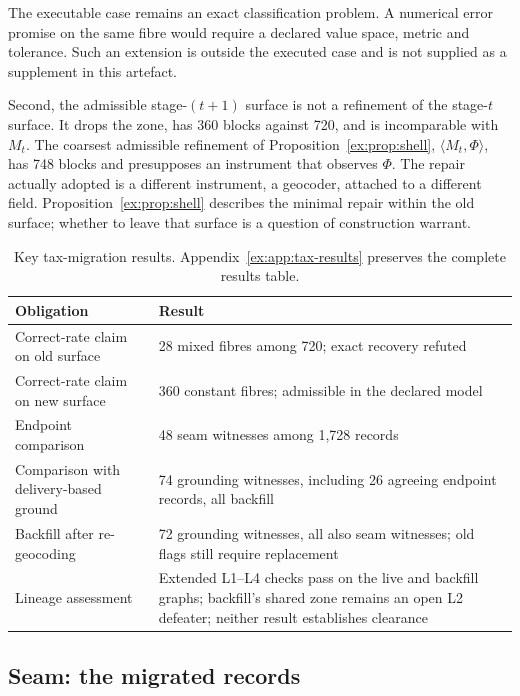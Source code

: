 \documentclass[11pt]{article}
\theoremstyle{definition}
\begin{document}
The executable case remains an exact classification problem. A numerical error promise on the same fibre would require a declared value space, metric and tolerance. Such an extension is outside the executed case and is not supplied as a supplement in this artefact.

Second, the admissible stage-$(t+1)$ surface is not a refinement of the stage-$t$ surface. It drops the zone, has 360 blocks against 720, and is incomparable with $M_t$. The coarsest admissible refinement of Proposition~\ref{ex:prop:shell}, $\langle M_t,\Phi\rangle$, has 748 blocks and presupposes an instrument that observes $\Phi$. The repair actually adopted is a different instrument, a geocoder, attached to a different field. Proposition~\ref{ex:prop:shell} describes the minimal repair within the old surface; whether to leave that surface is a question of construction warrant.

\begin{table}[htbp]
\centering\small
\caption{Key tax-migration results. Appendix~\ref{ex:app:tax-results} preserves the complete results table.}
\label{ex:tab:case-results}
\begin{tabularx}{\textwidth}{@{}P{4.7cm}L@{}}
\toprule
Obligation & Result \\
\midrule
Correct-rate claim on old surface & 28 mixed fibres among 720; exact recovery refuted \\
Correct-rate claim on new surface & 360 constant fibres; admissible in the declared model \\
Endpoint comparison & 48 seam witnesses among 1,728 records \\
Comparison with delivery-based ground & 74 grounding witnesses, including 26 agreeing endpoint records, all backfill \\
Backfill after re-geocoding & 72 grounding witnesses, all also seam witnesses; old flags still require replacement \\
Lineage assessment & Extended L1--L4 checks pass on the live and backfill graphs; backfill's shared zone remains an open L2 defeater; neither result establishes clearance \\
\bottomrule
\end{tabularx}
\end{table}

\subsection{Seam: the migrated records}
\end{document}
